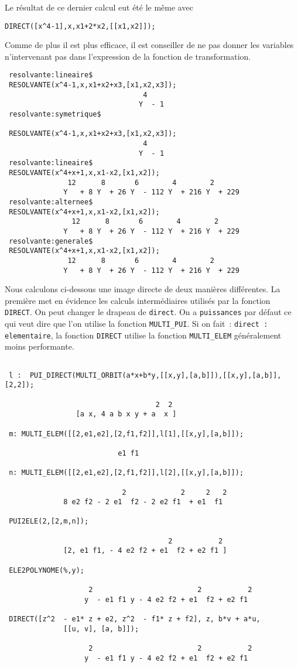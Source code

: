 \normalsize
Le r\'esultat de ce dernier calcul eut \'et\'e le m\^eme avec
\begin{verbatim} 
DIRECT([x^4-1],x,x1+2*x2,[[x1,x2]]);
\end{verbatim}
Comme de plus il est
plus efficace, il est conseiller de ne pas donner les variables 
n'intervenant pas dans l'expression de la fonction de transformation.
\small
\begin{verbatim} 
 resolvante:lineaire$
 RESOLVANTE(x^4-1,x,x1+x2+x3,[x1,x2,x3]);
                                 4
                                Y  - 1
 resolvante:symetrique$

 RESOLVANTE(x^4-1,x,x1+x2+x3,[x1,x2,x3]);
                                 4
                                Y  - 1
 resolvante:lineaire$
 RESOLVANTE(x^4+x+1,x,x1-x2,[x1,x2]);
               12      8       6        4        2
              Y   + 8 Y  + 26 Y  - 112 Y  + 216 Y  + 229
 resolvante:alternee$
 RESOLVANTE(x^4+x+1,x,x1-x2,[x1,x2]);
                12      8       6        4        2
              Y   + 8 Y  + 26 Y  - 112 Y  + 216 Y  + 229
 resolvante:generale$
 RESOLVANTE(x^4+x+1,x,x1-x2,[x1,x2]);
               12      8       6        4        2
              Y   + 8 Y  + 26 Y  - 112 Y  + 216 Y  + 229 
\end{verbatim}
\normalsize
Nous calculons ci-dessous une image directe de deux mani\`eres diff\'erentes.
La premi\`ere met en \'evidence les calculs interm\'ediaires
utilis\'es par la fonction {\tt DIRECT}.
On peut changer le drapeau de {\tt direct}. On a {\tt puissances} par
d\'efaut ce qui veut dire que l'on utilise la fonction {\tt MULTI\_PUI}. Si
on fait~: {\tt direct : elementaire}, la fonction {\tt DIRECT} utilise 
la fonction {\tt MULTI\_ELEM}
g\'en\'eralement moins performante.
\small
\begin{verbatim}

 l :  PUI_DIRECT(MULTI_ORBIT(a*x+b*y,[[x,y],[a,b]]),[[x,y],[a,b]],[2,2]);

                                    2  2
                 [a x, 4 a b x y + a  x ]

 m: MULTI_ELEM([[2,e1,e2],[2,f1,f2]],l[1],[[x,y],[a,b]]);

                           e1 f1

 n: MULTI_ELEM([[2,e1,e2],[2,f1,f2]],l[2],[[x,y],[a,b]]);

                            2             2     2   2
              8 e2 f2 - 2 e1  f2 - 2 e2 f1  + e1  f1

 PUI2ELE(2,[2,m,n]);

                                       2           2
              [2, e1 f1, - 4 e2 f2 + e1  f2 + e2 f1 ]
 
 ELE2POLYNOME(%,y);

                    2                         2           2
                   y  - e1 f1 y - 4 e2 f2 + e1  f2 + e2 f1

 DIRECT([z^2  - e1* z + e2, z^2  - f1* z + f2], z, b*v + a*u, 
              [[u, v], [a, b]]);

                    2                         2           2
                   y  - e1 f1 y - 4 e2 f2 + e1  f2 + e2 f1

\end{verbatim}
